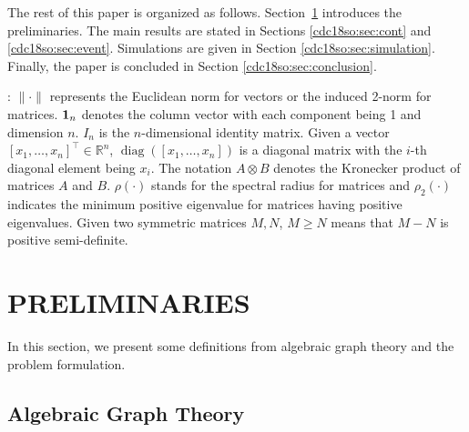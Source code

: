 \documentclass[letterpaper, 10 pt, conference]{ieeeconf}  %
\DeclareMathOperator{\diag}{diag}
\begin{document}



The rest of this paper is organized as follows. \mbox{Section \ref{cdc18so:sec:preliminaries}} introduces the preliminaries. The main results are stated in Sections \ref{cdc18so:sec:cont} and \ref{cdc18so:sec:event}. Simulations are given in Section \ref{cdc18so:sec:simulation}. Finally, the paper is concluded in Section \ref{cdc18so:sec:conclusion}.

: $\|\cdot\|$ represents the Euclidean norm for
vectors or the induced 2-norm for matrices. ${\bf 1}_n$ denotes the column
vector with each component being 1 and dimension $n$. $I_n$ is the $n$-dimensional identity matrix.
Given a vector $[x_1,\dots,x_n]^\top\in\mathbb{R}^n$, $\diag([x_1,\dots,x_n])$ is a diagonal matrix with the $i$-th diagonal element being $x_i$. The notation $A\otimes B$ denotes the Kronecker product
of matrices $A$ and $B$. $\rho(\cdot)$ stands for the spectral radius for matrices and $\rho_2(\cdot)$ indicates the minimum
positive eigenvalue for matrices having positive eigenvalues. Given two
symmetric matrices $M,N$, $M\ge N$ means that $M-N$ is positive semi-definite. %

\section{PRELIMINARIES}\label{cdc18so:sec:preliminaries}
In this section, we present some definitions from algebraic graph theory \cite{mesbahi2010graph} and  the problem formulation.


\subsection{Algebraic Graph Theory}
\end{document}
